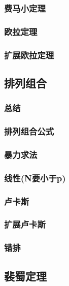 \documentclass[10pt,a4paper]{article}
\begin{document}
	\subsubsection{费马小定理}
	
	\subsubsection{欧拉定理}
	
	\subsubsection{扩展欧拉定理}
	
	\subsection{排列组合}
	\subsubsection{总结}
	
	\subsubsection{排列组合公式}
	
	\subsubsection{暴力求法}
	
	\subsubsection{线性(N要小于p)}
	
	\subsubsection{卢卡斯}
	
	\subsubsection{扩展卢卡斯}
	
	\subsubsection{错排}
	
	\subsection{裴蜀定理}
\end{document}
